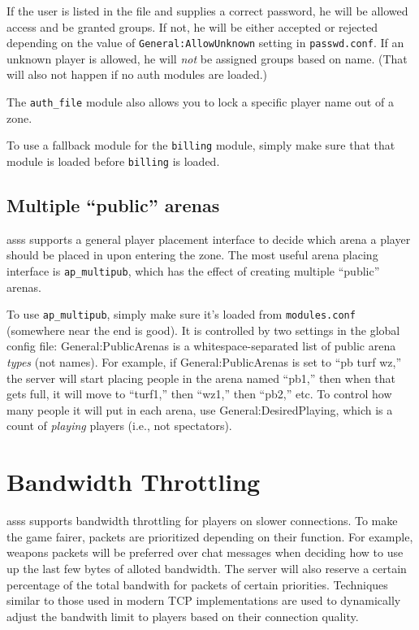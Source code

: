 \documentclass{article}
\newcommand{\asss}{asss}
\begin{document}
If the user is listed in the file and supplies a correct password, he
will be allowed access and be granted groups. If not, he will be either
accepted or rejected depending on the value of
\verb/General:AllowUnknown/ setting in \verb/passwd.conf/. If an unknown
player is allowed, he will \emph{not} be assigned groups based on name.
(That will also not happen if no auth modules are loaded.)

The \verb/auth_file/ module also allows you to lock a specific player
name out of a zone.

To use a fallback module for the \verb/billing/ module, simply make sure
that that module is loaded before \verb/billing/ is loaded.


\subsection{Multiple ``public'' arenas}

\asss{} supports a general player placement interface to decide which
arena a player should be placed in upon entering the zone. The most
useful arena placing interface is \verb/ap_multipub/, which has the
effect of creating multiple ``public'' arenas.

To use \verb/ap_multipub/, simply make sure it's loaded from
\verb/modules.conf/ (somewhere near the end is good). It is controlled
by two settings in the global config file: General:PublicArenas is a
whitespace-separated list of public arena \emph{types} (not names). For
example, if General:PublicArenas is set to ``pb turf wz,'' the server
will start placing people in the arena named ``pb1,'' then when that
gets full, it will move to ``turf1,'' then ``wz1,'' then ``pb2,'' etc.
To control how many people it will put in each arena, use
General:DesiredPlaying, which is a count of \emph{playing} players
(i.e., not spectators).


\section{Bandwidth Throttling}

\asss{} supports bandwidth throttling for players on slower connections.
To make the game fairer, packets are prioritized depending on their
function. For example, weapons packets will be preferred over chat
messages when deciding how to use up the last few bytes of alloted
bandwidth. The server will also reserve a certain percentage of the
total bandwith for packets of certain priorities. Techniques similar to
those used in modern TCP implementations are used to dynamically adjust
the bandwith limit to players based on their connection quality.
\end{document}
